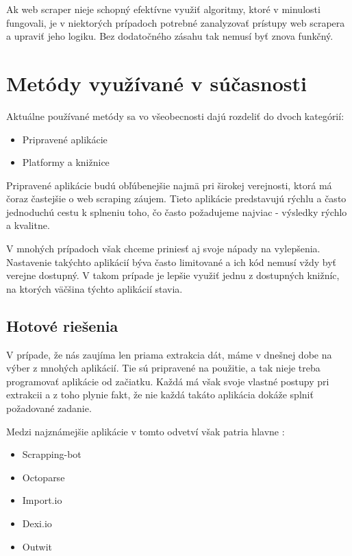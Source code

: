 Ak web scraper nieje schopný efektívne využiť algoritmy, ktoré v minulosti fungovali, je v niektorých prípadoch potrebné zanalyzovať prístupy web scrapera a upraviť jeho logiku. Bez dodatočného zásahu tak nemusí byť znova funkčný.

\section{Metódy využívané v súčasnosti}

Aktuálne používané metódy sa vo všeobecnosti dajú rozdeliť do dvoch kategórií:
\begin{itemize}
    \item {Pripravené aplikácie}
    \item {Platformy a knižnice}
\end{itemize}

\bigskip

Pripravené aplikácie budú obľúbenejšie najmä pri širokej verejnosti, ktorá má čoraz častejšie o web scraping záujem. Tieto aplikácie predstavujú rýchlu a často jednoduchú cestu k splneniu toho, čo často požadujeme najviac - výsledky rýchlo a kvalitne.

V mnohých prípadoch však chceme priniesť aj svoje nápady na vylepšenia. Nastavenie takýchto aplikácií býva často limitované a ich kód nemusí vždy byť verejne dostupný. V takom prípade je lepšie využiť jednu z dostupných knižníc, na ktorých väčšina týchto aplikácií stavia. 

\subsection{Hotové riešenia}
V prípade, že nás zaujíma len priama extrakcia dát, máme v dnešnej dobe na výber z mnohých aplikácií. Tie sú pripravené na použitie, a tak nieje treba programovať aplikácie od začiatku. Každá má však svoje vlastné postupy pri extrakcii a z toho plynie fakt, že nie každá takáto aplikácia dokáže splniť požadované zadanie. 

\newpage
Medzi najznámejšie aplikácie v tomto odvetví však patria hlavne \cite{WebScrap}:

\begin{itemize}
    \item {Scrapping-bot}
    \item {Octoparse}
    \item {Import.io}
    \item {Dexi.io}
    \item {Outwit}
\end{itemize}


